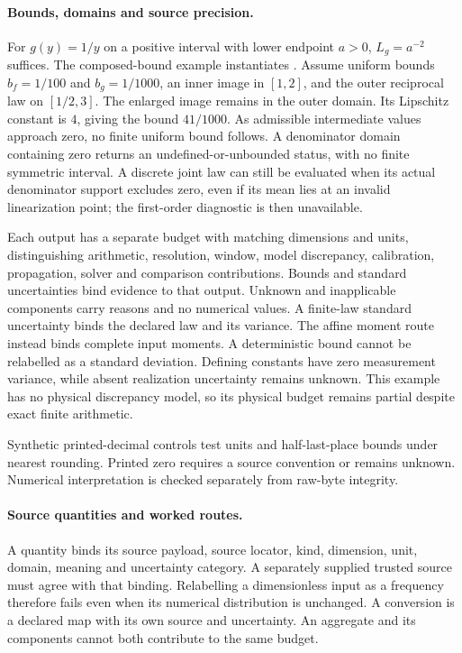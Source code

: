 \paragraph{Bounds, domains and source precision.}
For \(g(y)=1/y\) on a positive interval with lower endpoint \(a>0\),
\(L_g=a^{-2}\) suffices.
The composed-bound example instantiates
. Assume uniform bounds
\(b_f=1/100\) and \(b_g=1/1000\), an inner image in \([1,2]\), and the
outer reciprocal law on \([1/2,3]\). The enlarged image remains in the outer
domain. Its Lipschitz constant is \(4\), giving the bound \(41/1000\).
As admissible intermediate values approach zero, no finite uniform bound
follows. A denominator domain containing zero returns an undefined-or-unbounded status,
with no finite symmetric interval. A discrete joint law can still be evaluated
when its actual denominator support excludes zero, even if its mean lies at an
invalid linearization point; the first-order diagnostic is then unavailable.

Each output has a separate budget with matching dimensions and units,
distinguishing arithmetic, resolution, window, model discrepancy,
calibration, propagation, solver and comparison contributions. Bounds and
standard uncertainties bind evidence to that output. Unknown and
inapplicable components carry reasons and no numerical values. A finite-law
standard uncertainty binds the declared law and its variance. The affine
moment route instead binds complete input moments. A deterministic bound
cannot be relabelled as a standard deviation. Defining
constants have zero measurement variance, while absent realization uncertainty
remains unknown. This example has no physical discrepancy model, so its physical
budget remains partial despite exact finite arithmetic.

Synthetic printed-decimal controls test units and half-last-place bounds under
nearest rounding. Printed zero requires a source convention or remains unknown.
Numerical interpretation is checked separately from raw-byte integrity.

\paragraph{Source quantities and worked routes.}
\label{manual:m3-experimental-inputs}
A quantity binds its source payload, source locator, kind, dimension, unit,
domain, meaning and uncertainty category. A separately supplied trusted source
must agree with that binding. Relabelling a dimensionless input as a frequency
therefore fails even when its numerical distribution is unchanged. A conversion
is a declared map with its own source and uncertainty. An aggregate and its
components cannot both contribute to the same budget.

